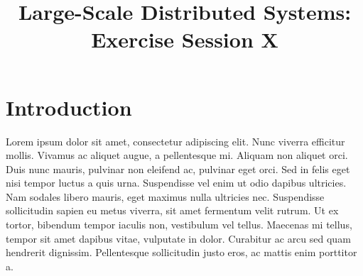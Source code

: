 

\title{Large-Scale Distributed Systems: Exercise Session X}
\maketitle

\section{Introduction}
\label{sec:introduction}

Lorem ipsum dolor sit amet, consectetur adipiscing elit. Nunc viverra efficitur mollis. Vivamus ac aliquet augue, a pellentesque mi. Aliquam non aliquet orci. Duis nunc mauris, pulvinar non eleifend ac, pulvinar eget orci. Sed in felis eget nisi tempor luctus a quis urna. Suspendisse vel enim ut odio dapibus ultricies. Nam sodales libero mauris, eget maximus nulla ultricies nec. Suspendisse sollicitudin sapien eu metus viverra, sit amet fermentum velit rutrum. Ut ex tortor, bibendum tempor iaculis non, vestibulum vel tellus. Maecenas mi tellus, tempor sit amet dapibus vitae, vulputate in dolor. Curabitur ac arcu sed quam hendrerit dignissim. Pellentesque sollicitudin justo eros, ac mattis enim porttitor a.


